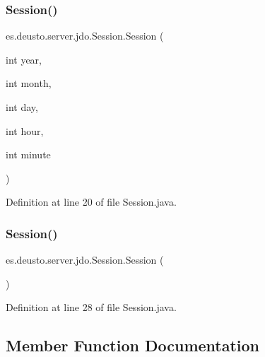 \subsubsection{\texorpdfstring{Session()}{Session()}\hspace{0.1cm}{\footnotesize\ttfamily [1/2]}}
{\footnotesize\ttfamily es.\+deusto.\+server.\+jdo.\+Session.\+Session (\begin{DoxyParamCaption}\item[{int}]{year,  }\item[{int}]{month,  }\item[{int}]{day,  }\item[{int}]{hour,  }\item[{int}]{minute }\end{DoxyParamCaption})}



Definition at line 20 of file Session.\+java.

\mbox{\label{classes_1_1deusto_1_1server_1_1jdo_1_1_session_aa32b7ce43993267c4b8567c8134b5c31}} 
\subsubsection{\texorpdfstring{Session()}{Session()}\hspace{0.1cm}{\footnotesize\ttfamily [2/2]}}
{\footnotesize\ttfamily es.\+deusto.\+server.\+jdo.\+Session.\+Session (\begin{DoxyParamCaption}{ }\end{DoxyParamCaption})}



Definition at line 28 of file Session.\+java.



\subsection{Member Function Documentation}
\mbox{\label{classes_1_1deusto_1_1server_1_1jdo_1_1_session_ade2b7eec9ef10a4c733aa3f4b18a8fe3}} 
